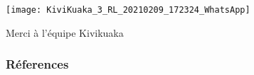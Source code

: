 \documentclass[10pt,compress]{beamer}
\begin{document}
\begin{frame}[plain]
  \begin{center}
    \texttt{[image: KiviKuaka\_3\_RL\_20210209\_172324\_WhatsApp]} \\
    \begin{Large}
      Merci à l'équipe Kivikuaka   
    \end{Large}
  \end{center}
\end{frame}


\begin{frame}[allowframebreaks]
  \begin{tiny}
    \frametitle{Réferences}
    
    
  \end{tiny}
\end{frame}
\end{document}
